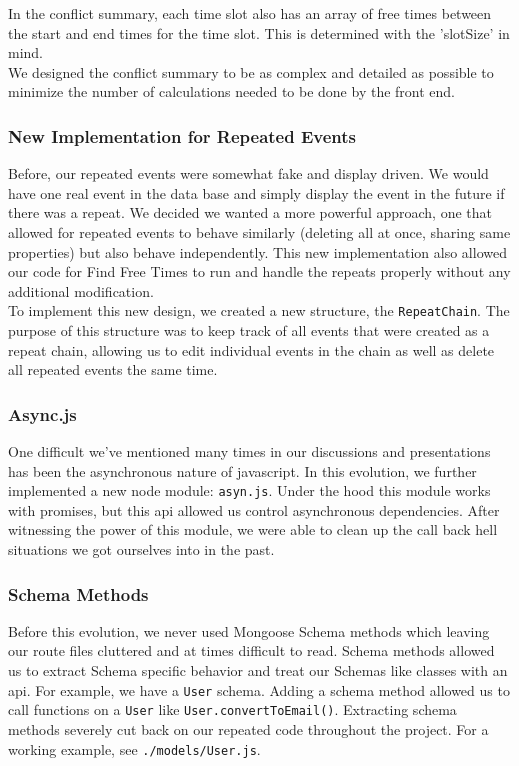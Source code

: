 \documentclass[11pt]{article}   %
\begin{document}
\noindent In the conflict summary, each time slot also has an array of free times between the start and end times for the time slot. This is determined with the 'slotSize' in mind. \\

\noindent We designed the conflict summary to be as complex and detailed as possible to minimize the number of calculations needed to be done by the front end.

\subsubsection{New Implementation for Repeated Events}
Before, our repeated events were somewhat fake and display driven. We would have one real event in the data base and simply display the event in the future if there was a repeat. We decided we wanted a more powerful approach, one that allowed for repeated events to behave similarly (deleting all at once, sharing same properties) but also behave independently. This new implementation also allowed our code for Find Free Times to run and handle the repeats properly without any additional modification.\\

\noindent To implement this new design, we created a new structure, the \texttt{RepeatChain}. The purpose of this structure was to keep track of all events that were created as a repeat chain, allowing us to edit individual events in the chain as well as delete all repeated events the same time.

\subsubsection{Async.js}
One difficult we've mentioned many times in our discussions and presentations has been the asynchronous nature of javascript. In this evolution, we further implemented a new node module: \texttt{asyn.js}. Under the hood this module works with promises, but this api allowed us control asynchronous dependencies. After witnessing the power of this module, we were able to clean up the call back hell situations we got ourselves into in the past.

\subsubsection{Schema Methods}
Before this evolution, we never used Mongoose Schema methods which leaving our route files cluttered and at times difficult to read. Schema methods allowed us to extract Schema specific behavior and treat our Schemas like classes with an api. For example, we have a \texttt{User} schema. Adding a schema method allowed us to call functions on a \texttt{User} like \texttt{User.convertToEmail()}. Extracting schema methods severely cut back on our repeated code throughout the project. For a working example, see \texttt{./models/User.js}.
\end{document}
